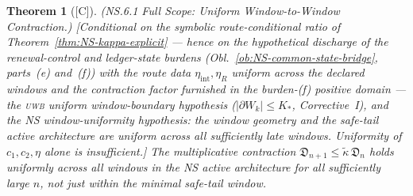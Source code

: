 \documentclass[12pt,oneside]{amsbook}
\theoremstyle{plain}
\newtheorem{theorem}{Theorem}[section]
\theoremstyle{definition}
\theoremstyle{remark}
\newcommand{\status}[1]{\textup{[#1]}}
\begin{document}
\begin{theorem}[\status{C}]\label{thm:NS61-global}
\textup{(NS.6.1 Full Scope: Uniform Window-to-Window Contraction.)}
\textup{[Conditional on the symbolic route-conditional ratio of
Theorem~\ref{thm:NS-kappa-explicit} --- hence on the hypothetical
discharge of the renewal-control and ledger-state burdens
(Obl.~\ref{ob:NS-common-state-bridge}, parts~(e) and~(f)) with the
route data $\eta_{\mathrm{int}}, \eta_R$ \emph{uniform across
the declared windows} and the contraction factor furnished in the
burden-(f) positive domain --- the \textsc{uwb} uniform
window-boundary hypothesis ($|\partial W_k| \leq K_*$,
Corrective~I), and the NS window-uniformity hypothesis: the window
geometry and the safe-tail active architecture are uniform across
all sufficiently late windows. Uniformity of $c_1, c_2, \eta$
alone is insufficient.]}
The multiplicative contraction
$\mathfrak{D}_{n+1} \leq \widetilde\kappa\,\mathfrak{D}_n$
holds uniformly across all windows in the NS active architecture
for all sufficiently large $n$, not just within the minimal
safe-tail window.
\end{theorem}
\end{document}
